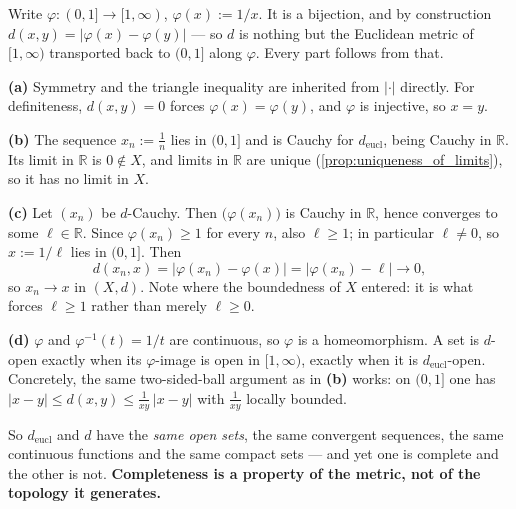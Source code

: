 \begin{exercisesolution}
Write $\varphi : (0,1] \to [1,\infty)$, $\varphi(x) := 1/x$. It is a bijection, and by
construction $d(x,y) = |\varphi(x)-\varphi(y)|$ --- so $d$ is nothing but the Euclidean metric
of $[1,\infty)$ transported back to $(0,1]$ along $\varphi$. Every part follows from that.

\textbf{(a)} Symmetry and the triangle inequality are inherited from $|\cdot|$ directly. For
definiteness, $d(x,y)=0$ forces $\varphi(x)=\varphi(y)$, and $\varphi$ is injective, so $x=y$.

\textbf{(b)} The sequence $x_n := \tfrac1n$ lies in $(0,1]$ and is Cauchy for
$d_{\text{eucl}}$, being Cauchy in $\mathbb{R}$. Its limit in $\mathbb{R}$ is $0 \notin X$, and
limits in $\mathbb{R}$ are unique (\cref{prop:uniqueness_of_limits}), so it has no limit in $X$.

\textbf{(c)} Let $(x_n)$ be $d$-Cauchy. Then $\big(\varphi(x_n)\big)$ is Cauchy in $\mathbb{R}$,
hence converges to some $\ell \in \mathbb{R}$. Since $\varphi(x_n) \geq 1$ for every $n$, also
$\ell \geq 1$; in particular $\ell \neq 0$, so $x := 1/\ell$ lies in $(0,1]$. Then
\[d(x_n,x) = \big|\varphi(x_n) - \varphi(x)\big| = \big|\varphi(x_n)-\ell\big| \longrightarrow 0,\]
so $x_n \to x$ in $(X,d)$. Note where the boundedness of $X$ entered: it is what forces
$\ell \geq 1$ rather than merely $\ell \geq 0$.

\textbf{(d)} $\varphi$ and $\varphi^{-1}(t) = 1/t$ are continuous, so $\varphi$ is a
homeomorphism. A set is $d$-open exactly when its $\varphi$-image is open in $[1,\infty)$,
exactly when it is $d_{\text{eucl}}$-open. Concretely, the same two-sided-ball argument as in
\textbf{(b)} works: on $(0,1]$ one has
$|x-y| \leq d(x,y) \leq \tfrac{1}{x y}\,|x-y|$ with $\tfrac{1}{xy}$ locally bounded.

\begin{remark}
So $d_{\text{eucl}}$ and $d$ have the \emph{same open sets}, the same convergent sequences, the
same continuous functions and the same compact sets --- and yet one is complete and the other is
not. \textbf{Completeness is a property of the metric, not of the topology it generates.}


\end{remark}
\end{exercisesolution}
